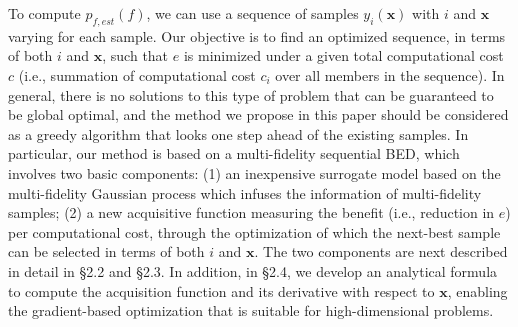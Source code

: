 \documentclass[11pt]{article}
\begin{document}
To compute $p_{f,est}(f)$, we can use a sequence of samples $y_i(\mathbf{x})$ with $i$ and $\mathbf{x}$ varying for each sample. Our objective is to find an optimized sequence, in terms of both $i$ and $\mathbf{x}$, such that $e$ is minimized under a given total computational cost $c$ (i.e., summation of computational cost $c_i$ over all members in the sequence). In general, there is no solutions to this type of problem that can be guaranteed to be global optimal, and the method we propose in this paper should be considered as a greedy algorithm that looks one step ahead of the existing samples. In particular, our method is based on  a multi-fidelity sequential BED, which involves two basic components: (1) an inexpensive surrogate model based on the multi-fidelity Gaussian process which infuses the information of multi-fidelity samples; (2) a new acquisitive function measuring the benefit (i.e., reduction in $e$) per computational cost, through the optimization of which the next-best sample can be selected in terms of both $i$ and $\mathbf{x}$. The two components are next described in detail in \S2.2 and \S2.3. In addition, in \S2.4, we develop an analytical formula to compute the acquisition function and its derivative with respect to $\mathbf{x}$, enabling the gradient-based optimization that is suitable for high-dimensional problems. 
\end{document}
